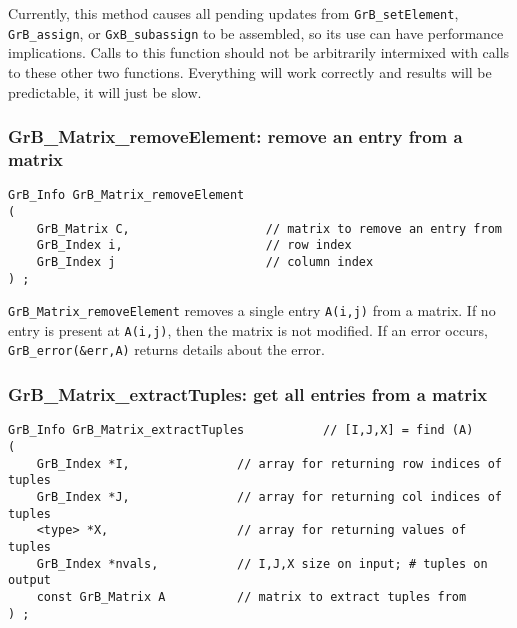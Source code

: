 \documentclass[12pt]{article}
\begin{document}
Currently, this method causes all pending updates from
\verb'GrB_setElement', \verb'GrB_assign', or \verb'GxB_subassign' to be
assembled, so its use can have performance implications.  Calls to this
function should not be arbitrarily intermixed with calls to these other two
functions.  Everything will work correctly and results will be predictable, it
will just be slow.

\subsubsection{{\sf GrB\_Matrix\_removeElement:} remove an entry from a matrix}
\label{matrix_removeElement}

\begin{mdframed}[userdefinedwidth=6in]
{\footnotesize
\begin{verbatim}
GrB_Info GrB_Matrix_removeElement
(
    GrB_Matrix C,                   // matrix to remove an entry from
    GrB_Index i,                    // row index
    GrB_Index j                     // column index
) ;
\end{verbatim} } \end{mdframed}

\verb'GrB_Matrix_removeElement' removes a single entry \verb'A(i,j)' from a matrix.
If no entry is present at \verb'A(i,j)', then the matrix is not modified.
If an error occurs, \verb'GrB_error(&err,A)' returns details about the error.

\subsubsection{{\sf GrB\_Matrix\_extractTuples:} get all entries from a matrix}
\label{matrix_extractTuples}

\begin{mdframed}[userdefinedwidth=6in]
{\footnotesize
\begin{verbatim}
GrB_Info GrB_Matrix_extractTuples           // [I,J,X] = find (A)
(
    GrB_Index *I,               // array for returning row indices of tuples
    GrB_Index *J,               // array for returning col indices of tuples
    <type> *X,                  // array for returning values of tuples
    GrB_Index *nvals,           // I,J,X size on input; # tuples on output
    const GrB_Matrix A          // matrix to extract tuples from
) ;
\end{verbatim} } \end{mdframed}
\end{document}
